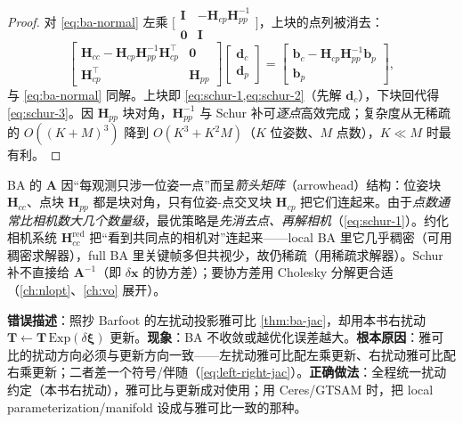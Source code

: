 \begin{proof}
对 \cref{eq:ba-normal} 左乘 $\big[\begin{smallmatrix}\mathbf{I}&-\mathbf{H}_{cp}\mathbf{H}_{pp}^{-1}\\\mathbf{0}&\mathbf{I}\end{smallmatrix}\big]$，上块的点列被消去\cite{carlone2026handbook}：
\[
  \begin{bmatrix}\mathbf{H}_{cc}-\mathbf{H}_{cp}\mathbf{H}_{pp}^{-1}\mathbf{H}_{cp}^\top&\mathbf{0}\\\mathbf{H}_{cp}^\top&\mathbf{H}_{pp}\end{bmatrix}
  \begin{bmatrix}\mathbf{d}_c\\\mathbf{d}_p\end{bmatrix}
  =\begin{bmatrix}\mathbf{b}_c-\mathbf{H}_{cp}\mathbf{H}_{pp}^{-1}\mathbf{b}_p\\\mathbf{b}_p\end{bmatrix},
\]
与 \cref{eq:ba-normal} 同解。上块即 \cref{eq:schur-1,eq:schur-2}（先解 $\mathbf{d}_c$），下块回代得 \cref{eq:schur-3}。因 $\mathbf{H}_{pp}$ 块对角，$\mathbf{H}_{pp}^{-1}$ 与 Schur 补可\emph{逐点}高效完成；复杂度从无稀疏的 $O((K+M)^3)$ 降到 $O(K^3+K^2M)$（$K$ 位姿数、$M$ 点数），$K\ll M$ 时最有利\cite{barfoot2024state}。
\end{proof}

\begin{insight}
BA 的 $\mathbf{A}$ 因“每观测只涉一位姿一点”而呈\emph{箭头矩阵}（arrowhead）结构\cite{barfoot2024state}：位姿块 $\mathbf{H}_{cc}$、点块 $\mathbf{H}_{pp}$ 都是块对角，只有位姿-点交叉块 $\mathbf{H}_{cp}$ 把它们连起来。由于\emph{点数通常比相机数大几个数量级}，最优策略是\emph{先消去点、再解相机}（\cref{eq:schur-1}）。约化相机系统 $\mathbf{H}_{cc}^{\text{red}}$ 把“看到共同点的相机对”连起来——local BA 里它几乎稠密（可用稠密求解器），full BA 里关键帧多但共视少，故仍稀疏（用稀疏求解器）。Schur 补不直接给 $\mathbf{A}^{-1}$（即 $\delta\mathbf{x}$ 的协方差）；要协方差用 Cholesky 分解更合适\cite{barfoot2024state}（\cref{ch:nlopt}、\cref{ch:vo} 展开）。
\end{insight}

\begin{pitfall}
\textbf{错误描述}：照抄 Barfoot 的左扰动投影雅可比 \cref{thm:ba-jac}，却用本书右扰动 $\mathbf{T}\leftarrow\mathbf{T}\,\mathrm{Exp}(\delta\boldsymbol\xi)$ 更新。\textbf{现象}：BA 不收敛或越优化误差越大。\textbf{根本原因}：雅可比的扰动方向必须与更新方向一致——左扰动雅可比配左乘更新、右扰动雅可比配右乘更新；二者差一个符号/伴随（\cref{eq:left-right-jac}）。\textbf{正确做法}：全程统一扰动约定（本书右扰动），雅可比与更新成对使用；用 Ceres/GTSAM 时，把 local parameterization/manifold 设成与雅可比一致的那种。
\end{pitfall}

